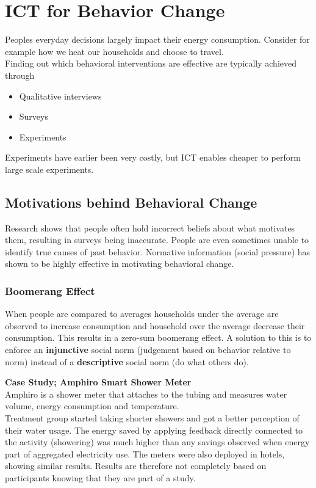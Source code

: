 \section{ICT for Behavior Change}
Peoples everyday decisions largely impact their energy consumption.
Consider for example how we heat our households and choose to travel.\\

Finding out which behavioral interventions are effective are typically achieved through
\begin{itemize}
    \item Qualitative interviews
    \item Surveys
    \item Experiments
\end{itemize}
Experiments have earlier been very costly, but ICT enables cheaper to perform large scale experiments.

\subsection{Motivations behind Behavioral Change}
Research shows that people often hold incorrect beliefs about what motivates them, resulting in surveys being inaccurate.
People are even sometimes unable to identify true causes of past behavior.
Normative information (social pressure) has shown to be highly effective in motivating behavioral change.

\subsubsection{Boomerang Effect}
When people are compared to averages households under the average are observed to increase consumption and household over the average decrease their consumption.
This results in a zero-sum boomerang effect.
A solution to this is to enforce an \textbf{injunctive} social norm (judgement based on behavior relative to norm) instead of a \textbf{descriptive} social norm (do what others do).

\begin{tcolorbox}
\textbf{Case Study; Amphiro Smart Shower Meter}\\
Amphiro is a shower meter that attaches to the tubing and measures water volume, energy consumption and temperature.\\

Treatment group started taking shorter showers and got a better perception of their water usage.
The energy saved by applying feedback directly connected to the activity (showering) was much higher than any savings observed when energy part of aggregated electricity use.
The meters were also deployed in hotels, showing similar results.
Results are therefore not completely based on participants knowing that they are part of a study.

\end{tcolorbox}

